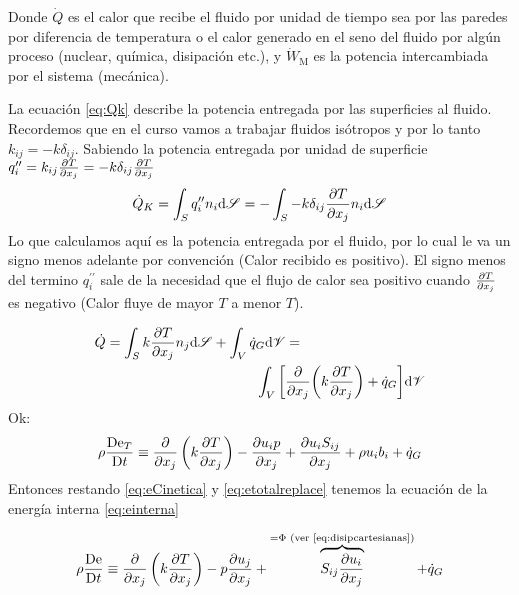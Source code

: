 Donde $\dot{Q}$ es el calor que recibe el fluido por unidad de tiempo sea por las paredes por diferencia de temperatura o el calor generado en el seno del fluido por algún proceso (nuclear, química, disipación etc.), y $\dot{W}_\textrm{M}$ es la potencia intercambiada por el sistema (mecánica).


 La ecuación \ref{eq:Qk} describe la potencia entregada por las superficies al fluido. Recordemos que en el curso vamos a trabajar fluidos isótropos y por lo tanto $k_{ij}=-k \delta_{ij}$. Sabiendo la potencia entregada por unidad de superficie $q_i^{\prime \prime}=k_{ij}\frac{\partial T}{\partial x_j}=-k\delta_{ij}\frac{\partial T}{\partial x_j}$ 
\begin{equation}\label{eq:Qk}
    \dot{Q}_K=\int_S q_i^{\prime \prime} n_i \textrm{d} \mathscr{S} = -\int_S - k\delta_{ij}\frac{\partial T}{\partial x_j}n_i \textrm{d} \mathscr{S}
\end{equation}
Lo que calculamos aquí es la potencia entregada por el fluido, por lo cual le va un signo menos adelante por convención (Calor recibido es positivo). El signo menos del termino $q_i^{\prime \prime} $ sale de la necesidad que el flujo de calor sea positivo cuando $\frac{\partial T}{\partial x_j}$ es negativo (Calor fluye de mayor $T$ a menor $T$).


\begin{align*}
    \dot{Q}=\int_S k\frac{\partial T}{\partial x_j} n_j \textrm{d} \mathscr{S} + \int_V \dot{q}_G \textrm{d} \mathscr{V} &=\\
    \int_V \bigg[ &\frac{\partial  }{\partial x_j} \bigg( k   \frac{\partial T}{\partial x_j} \bigg) + \dot{q}_G \bigg] \textrm{d} \mathscr{V}
\end{align*}
Ok:
\begin{equation} \label{eq:etotalreplace}
    \rho \frac{\textrm{D} \textrm{e}_T}{\textrm{D} t}\equiv \frac{\partial }{\partial x_j}\left(k\frac{\partial T}{\partial x_j}\right) - \frac{\partial u_i p}{\partial x_j}+\frac{\partial u_i S_{ij}}{\partial x_j}+\rho u_i b_i+\dot{q}_G
\end{equation}
Entonces restando \ref{eq:eCinetica} y \ref{eq:etotalreplace} tenemos la ecuación de la energía interna \ref{eq:einterna}

\begin{equation} \label{eq:einterna}
    \rho \frac{\textrm{D} \textrm{e}}{\textrm{D} t}\equiv \frac{\partial }{\partial x_j}\left( k\frac{\partial T}{\partial x_j}\right) - p \frac{\partial u_j}{\partial x_j} +\overbrace{S_{ij} \frac{\partial u_i}{\partial x_j}}^{=\Phi \textrm{ (ver \eqref{eq:disipcartesianas})}}+\dot{q}_G
\end{equation}